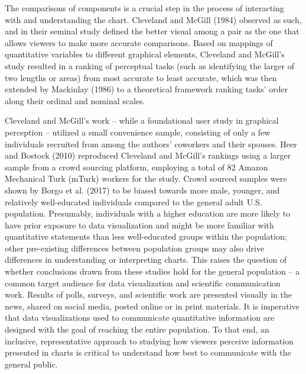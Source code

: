 \documentclass[
]{jds}
\begin{document}
The comparisons of components is a crucial step in the process of
interacting with and understanding the chart. Cleveland and McGill
(1984) observed as such, and in their seminal study defined the better
visual among a pair as the one that allows viewers to make more accurate
comparisons. Based on mappings of quantitative variables to different
graphical elements, Cleveland and McGill's study resulted in a ranking
of perceptual tasks (such as identifying the larger of two lengths or
areas) from most accurate to least accurate, which was then extended by
Mackinlay (1986) to a theoretical framework ranking tasks' order along
their ordinal and nominal scales.

Cleveland and McGill's work -- while a foundational user study in
graphical perception -- utilized a small convenience sample, consisting
of only a few individuals recruited from among the authors' coworkers
and their spouses. Heer and Bostock (2010) reproduced Cleveland and
McGill's rankings using a larger sample from a crowd sourcing platform,
employing a total of 82 Amazon Mechanical Turk (mTurk) workers for the
study. Crowd sourced samples were shown by Borgo et al. (2017) to be
biased towards more male, younger, and relatively well-educated
individuals compared to the general adult U.S. population. Presumably,
individuals with a higher education are more likely to have prior
exposure to data visualization and might be more familiar with
quantitative statements than less well-educated groups within the
population; other pre-existing differences between population groups may
also drive differences in understanding or interpreting charts. This
raises the question of whether conclusions drawn from these studies hold
for the general population -- a common target audience for data
visualization and scientific communication work. Results of polls,
surveys, and scientific work are presented visually in the news, shared
on social media, posted online or in print materials. It is imperative
that data visualizations used to communicate quantitative information
are designed with the goal of reaching the entire population. To that
end, an inclusive, representative approach to studying how viewers
perceive information presented in charts is critical to understand how
best to communicate with the general public.
\end{document}
